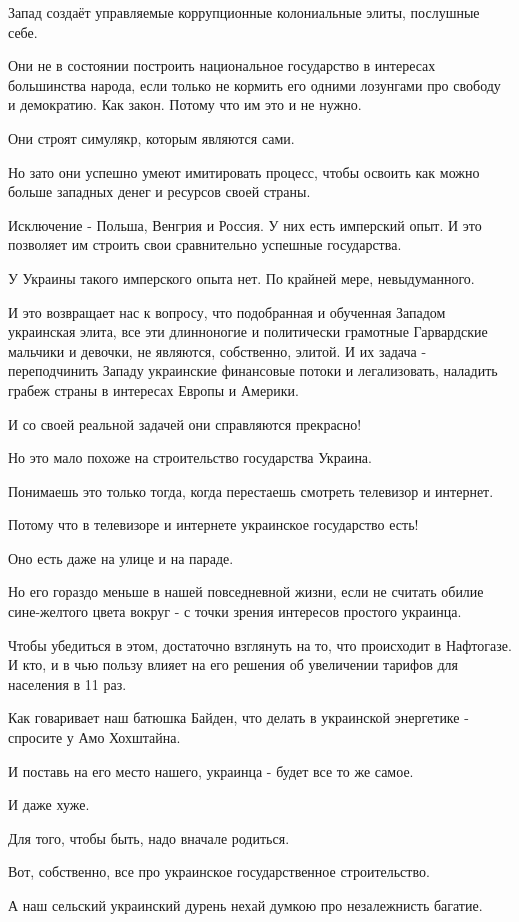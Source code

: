 Запад создаёт управляемые коррупционные колониальные элиты, послушные себе.

Они не в состоянии построить национальное государство в интересах большинства
народа, если только не кормить его одними лозунгами про свободу и демократию.
Как закон. Потому что им это и не нужно.

Они строят симулякр, которым являются сами.

Но зато они успешно умеют имитировать процесс, чтобы освоить как можно больше
западных денег и ресурсов своей страны.

Исключение - Польша, Венгрия и Россия. У них есть имперский опыт. И это
позволяет им строить свои сравнительно успешные государства.

У Украины такого имперского опыта нет. По крайней мере, невыдуманного.

И это возвращает нас к вопросу, что подобранная и обученная Западом украинская
элита, все эти длинноногие и политически грамотные Гарвардские мальчики и
девочки, не являются, собственно, элитой. И их задача - переподчинить Западу
украинские финансовые потоки и легализовать, наладить грабеж страны в интересах
Европы и Америки.

И со своей реальной задачей они справляются прекрасно!

Но это мало похоже на строительство государства Украина.

Понимаешь это только тогда, когда перестаешь смотреть телевизор и интернет.

Потому что в телевизоре и интернете украинское государство есть!

Оно есть даже на улице и на параде.

Но его гораздо меньше в нашей повседневной жизни, если не считать обилие
сине-желтого цвета вокруг - с точки зрения интересов простого украинца.

Чтобы убедиться в этом, достаточно взглянуть на то, что происходит в Нафтогазе.
И кто, и в чью пользу влияет на его решения об увеличении тарифов для населения
в 11 раз.

Как говаривает наш батюшка Байден, что делать в украинской энергетике -
спросите у Амо Хохштайна.

И поставь на его место нашего, украинца - будет все то же самое.

И даже хуже.

Для того, чтобы быть, надо вначале родиться.

Вот, собственно, все про украинское государственное строительство.

А наш сельский украинский дурень нехай думкою про незалежнисть багатие.

